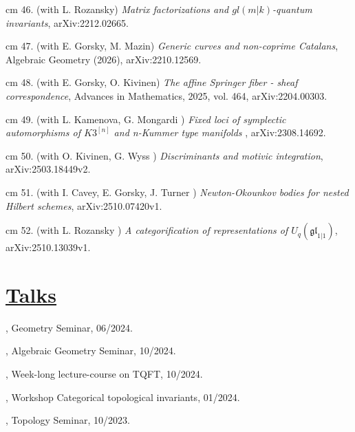 \documentclass[11pt]{amsart}
\theoremstyle{plain}
\theoremstyle{definition}
\theoremstyle{remark}
\begin{document}
\noindent{} cm 46. (with L. Rozansky)
{\it  Matrix factorizations and \(gl(m|k)\)-quantum invariants}, arXiv:2212.02665.

\noindent{} cm 47. (with E. Gorsky, M. Mazin)
{\it  Generic curves and non-coprime Catalans}, Algebraic Geometry (2026), arXiv:2210.12569.

\noindent{} cm 48. (with E. Gorsky, O. Kivinen)
{\it The affine Springer fiber - sheaf correspondence}, {Advances in Mathematics},
 2025,
  vol. 464, arXiv:2204.00303.

\noindent{} cm 49. (with L. Kamenova, G. Mongardi )
{\it Fixed loci of symplectic automorphisms of \(K3^{[n]}\) and n-Kummer type manifolds
}, arXiv:2308.14692.

\noindent{} cm 50. (with O. Kivinen, G. Wyss )
{\it Discriminants and motivic integration},
  arXiv:2503.18449v2.



\noindent{} cm 51. (with I. Cavey, E. Gorsky, J. Turner )
{\it Newton-Okounkov bodies for nested Hilbert schemes},
arXiv:2510.07420v1.




\noindent{} cm 52. (with L. Rozansky )
{\it A categorification of representations of
                  $U_q(\mathfrak{gl}_{1|1})$},
 arXiv:2510.13039v1.














\section*{\Large\underline{Talks}}



\medskip


, Geometry Seminar, 06/2024.

, Algebraic Geometry Seminar, 10/2024.


, Week-long lecture-course on TQFT, 10/2024.



, Workshop Categorical topological invariants, 01/2024.


, Topology Seminar, 10/2023.
\end{document}
